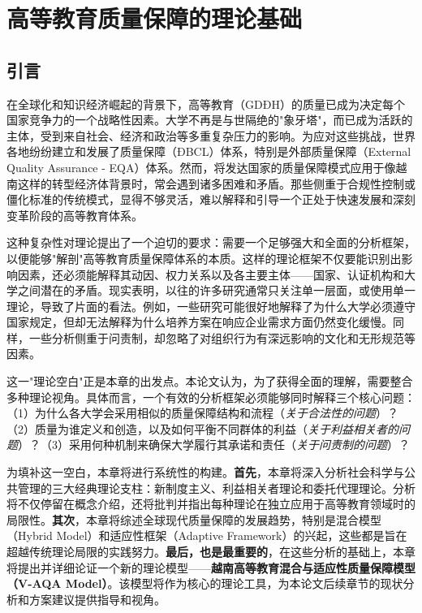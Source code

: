 \chapter{高等教育质量保障的理论基础}
\label{chap:ly_luan}

\section*{引言}

在全球化和知识经济崛起的背景下，高等教育（GDĐH）的质量已成为决定每个国家竞争力的一个战略性因素。大学不再是与世隔绝的"象牙塔"，而已成为活跃的主体，受到来自社会、经济和政治等多重复杂压力的影响。为应对这些挑战，世界各地纷纷建立和发展了质量保障（ĐBCL）体系，特别是外部质量保障（External Quality Assurance - EQA）体系。然而，将发达国家的质量保障模式应用于像越南这样的转型经济体背景时，常会遇到诸多困难和矛盾。那些侧重于合规性控制或僵化标准的传统模式，显得不够灵活，难以解释和引导一个正处于快速发展和深刻变革阶段的高等教育体系。

这种复杂性对理论提出了一个迫切的要求：需要一个足够强大和全面的分析框架，以便能够"解剖"高等教育质量保障体系的本质。这样的理论框架不仅要能识别出影响因素，还必须能解释其动因、权力关系以及各主要主体——国家、认证机构和大学之间潜在的矛盾。现实表明，以往的许多研究通常只关注单一层面，或使用单一理论，导致了片面的看法。例如，一些研究可能很好地解释了为什么大学必须遵守国家规定，但却无法解释为什么培养方案在响应企业需求方面仍然变化缓慢。同样，一些分析侧重于问责制，却忽略了对组织行为有深远影响的文化和无形规范等因素。

这一"理论空白"正是本章的出发点。本论文认为，为了获得全面的理解，需要整合多种理论视角。具体而言，一个有效的分析框架必须能够同时解释三个核心问题：（1）为什么各大学会采用相似的质量保障结构和流程（\textit{关于合法性的问题}）？（2）质量为谁定义和创造，以及如何平衡不同群体的利益（\textit{关于利益相关者的问题}）？（3）采用何种机制来确保大学履行其承诺和责任（\textit{关于问责制的问题}）？

为填补这一空白，本章将进行系统性的构建。\textbf{首先}，本章将深入分析社会科学与公共管理的三大经典理论支柱：新制度主义、利益相关者理论和委托代理理论。分析将不仅停留在概念介绍，还将批判并指出每种理论在独立应用于高等教育领域时的局限性。\textbf{其次}，本章将综述全球现代质量保障的发展趋势，特别是混合模型（Hybrid Model）和适应性框架（Adaptive Framework）的兴起，这些都是旨在超越传统理论局限的实践努力。\textbf{最后，也是最重要的}，在这些分析的基础上，本章将提出并详细论证一个新的理论模型——\textbf{越南高等教育混合与适应性质量保障模型（V-AQA Model）}。该模型将作为核心的理论工具，为本论文后续章节的现状分析和方案建议提供指导和视角。


